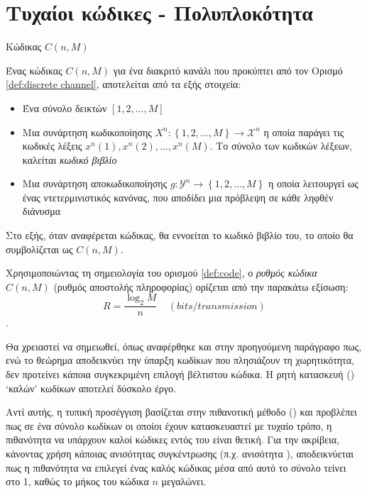 \section{Τυχαίοι κώδικες - Πολυπλοκότητα}
\begin{definition}{Κώδικας $C(n,M)$}

Ένας κώδικας $C(n,M)$ για ένα διακριτό κανάλι που προκύπτει από τον Ορισμό \ref{def:discrete channel}, αποτελείται από τα εξής στοιχεία:
\begin{itemize}
\item Ένα σύνολο δεικτών $[1, 2, \ldots, M]$ 
\item Μια συνάρτηση κωδικοποίησης $X^n:\left\lbrace1, 2, \ldots, M\right\rbrace\to\mathcal{X}^n$ η οποία παράγει τις κωδικές λέξεις $x^n\left(1\right), x^n\left(2\right), \ldots, x^n\left(M\right)$. Το σύνολο των κωδικών λέξεων, καλείται \textit{κωδικό βιβλίο}
\item Μια συνάρτηση αποκωδικοποίησης $g:\mathcal{Y}^n\to\left\lbrace1, 2, \ldots, M\right\rbrace$ η οποία λειτουργεί ως ένας ντετερμινιστικός κανόνας, που αποδίδει μια πρόβλεψη σε κάθε ληφθέν διάνυσμα
\end{itemize}
Στο εξής, όταν αναφέρεται κώδικας, θα εννοείται το κωδικό βιβλίο του, το οποίο θα συμβολίζεται ως $C(n,M)$.
\label{def:code}
\end{definition}

Χρησιμοποιώντας τη σημειολογία του ορισμού \ref{def:code}, ο \textit{ρυθμός κώδικα} $C(n,M)$ (ρυθμός αποστολής πληροφορίας) ορίζεται από την παρακάτω εξίσωση:
\begin{equation}
R=\frac{\log_{2}M}{n}\;\;\;\;(bits/transmission)
\label{eq: code rate}
\end{equation}
\cite{cover2012elements}.

Θα χρειαστεί να σημειωθεί, όπως αναφέρθηκε και στην προηγούμενη παράγραφο πως, ενώ το θεώρημα  αποδεικνύει την ύπαρξη κωδίκων που πλησιάζουν τη χωρητικότητα, δεν προτείνει κάποια συγκεκριμένη επιλογή βέλτιστου κώδικα. Η ρητή κατασκευή () \enquote*{καλών} κωδίκων αποτελεί δύσκολο έργο.

Αντί αυτής, η τυπική προσέγγιση βασίζεται στην πιθανοτική μέθοδο () και προβλέπει πως σε ένα σύνολο κωδίκων οι οποίοι έχουν κατασκευαστεί με τυχαίο τρόπο, η πιθανότητα να υπάρχουν καλοί κώδικες εντός του είναι θετική. Για την ακρίβεια, κάνοντας χρήση κάποιας ανισότητας συγκέντρωσης (π.χ. ανισότητα ), αποδεικνύεται πως η πιθανότητα να επιλεγεί ένας καλός κώδικας μέσα από αυτό το σύνολο τείνει στο 1, καθώς το μήκος του κώδικα $n$ μεγαλώνει.

